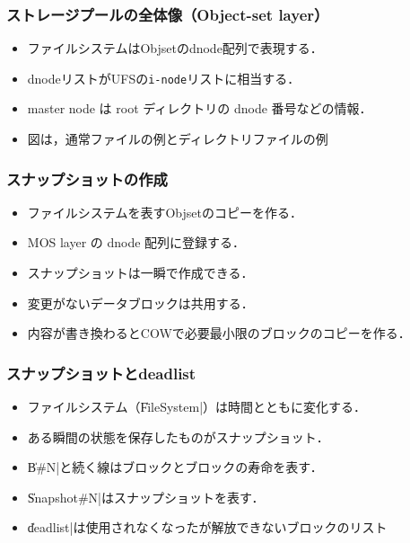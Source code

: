 \documentclass[unicode]{beamer}                   %
\begin{document}
\begin{frame}[fragile]
  \frametitle{ストレージプールの全体像（Object-set layer）}
  \begin{itemize}
  \item ファイルシステムはObjsetのdnode配列で表現する．
  \item dnodeリストがUFSの\texttt{i-node}リストに相当する．
  \item master node は root ディレクトリの dnode 番号などの情報．
  \item 図は，通常ファイルの例とディレクトリファイルの例
  \end{itemize}
  \vfill
\end{frame}

\begin{frame}[fragile]
  \frametitle{スナップショットの作成}
  \begin{itemize}
  \item ファイルシステムを表すObjsetのコピーを作る．
  \item MOS layer の dnode 配列に登録する．
  \item スナップショットは一瞬で作成できる．
  \item 変更がないデータブロックは共用する．
  \item 内容が書き換わるとCOWで必要最小限のブロックのコピーを作る．
  \end{itemize}
  \vfill
\end{frame}

\begin{frame}[fragile]
  \frametitle{スナップショットとdeadlist}
  \begin{itemize}
    \item ファイルシステム（\|FileSystem|）は時間とともに変化する．
    \item ある瞬間の状態を保存したものがスナップショット．
    \item \|B#N|と続く線はブロックとブロックの寿命を表す．
    \item \|Snapshot#N|はスナップショットを表す．
    \item \|deadlist|は使用されなくなったが解放できないブロックのリスト
  \end{itemize}
  \vfill
\end{frame}
\end{document}
